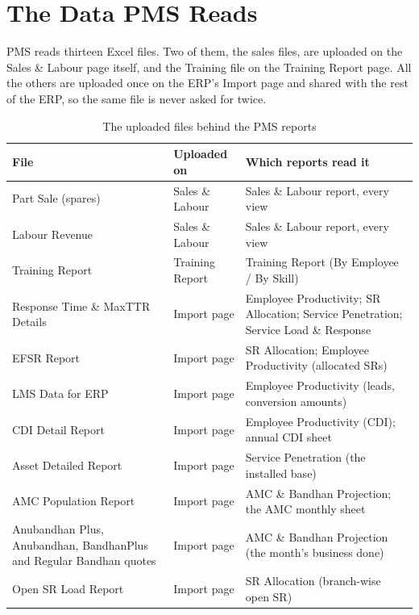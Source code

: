 \documentclass[11pt,a4paper]{article}
\begin{document}
\section{The Data PMS Reads}

PMS reads thirteen Excel files. Two of them, the sales files, are uploaded on the Sales \&
Labour page itself, and the Training file on the Training Report page. All the others are
uploaded once on the ERP's Import page and shared with the rest of the ERP, so the same
file is never asked for twice.

\begin{table}[H]\centering\small
\renewcommand{\arraystretch}{1.2}
\begin{tabularx}{\linewidth}{@{}|p{4.4cm}|p{3.1cm}|X|@{}}
\hline
\rowcolor{brdhead}\textbf{File} & \textbf{Uploaded on} & \textbf{Which reports read it}\\
\hline
Part Sale (spares) & Sales \& Labour & Sales \& Labour report, every view\\
\hline
Labour Revenue & Sales \& Labour & Sales \& Labour report, every view\\
\hline
Training Report & Training Report & Training Report (By Employee / By Skill)\\
\hline
Response Time \& MaxTTR Details & Import page & Employee Productivity; SR Allocation;
Service Penetration; Service Load \& Response\\
\hline
EFSR Report & Import page & SR Allocation; Employee Productivity (allocated SRs)\\
\hline
LMS Data for ERP & Import page & Employee Productivity (leads, conversion amounts)\\
\hline
CDI Detail Report & Import page & Employee Productivity (CDI); annual CDI sheet\\
\hline
Asset Detailed Report & Import page & Service Penetration (the installed base)\\
\hline
AMC Population Report & Import page & AMC \& Bandhan Projection; the AMC monthly sheet\\
\hline
Anubandhan Plus, Anubandhan, BandhanPlus and Regular Bandhan quotes & Import page &
AMC \& Bandhan Projection (the month's business done)\\
\hline
Open SR Load Report & Import page & SR Allocation (branch-wise open SR)\\
\hline
\end{tabularx}
\caption{The uploaded files behind the PMS reports}
\end{table}
\end{document}

